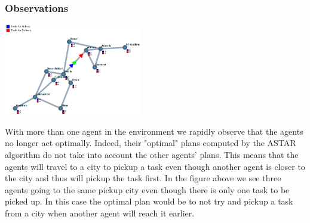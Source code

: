 \documentclass[11pt]{article}
\begin{document}
\subsubsection{Observations}
\begin{center}
\includegraphics[width=6cm]{follow.png}
\end{center}
With more than one agent in the environment we rapidly observe that the 
agents no longer act optimally. Indeed, their "optimal" plans computed by 
the ASTAR algorithm do not take into account the other agents' plans. 
This means that the agents will travel to a city to pickup a task even though 
another agent is closer to the city and thus will pickup the task first. 
In the figure above we see three agents going to the same pickup city even 
though there is only one task to be picked up. 
In this case the optimal plan would be to not try and pickup a task from a city 
when another agent will reach it earlier. 
\end{document}
